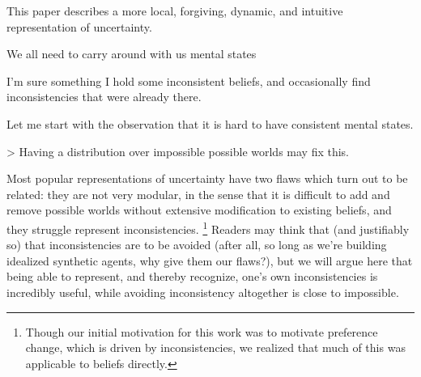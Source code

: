 \documentclass{article}
\newcommand\changeon{\color{note-fg} }
\begin{document}
	\changeon
	
	This paper describes a more local, forgiving, dynamic, and intuitive representation of uncertainty. 
	
	We all need to carry around with us mental states
	
	I'm sure something I hold some inconsistent beliefs, and occasionally find inconsistencies that were already there. 
	
	Let me start with the observation that it is hard to have consistent mental states.
	
		> Having a distribution over impossible possible worlds may fix this.

	Most popular representations of uncertainty have two flaws which turn out to be related: they are not very modular, in the sense that it is difficult to add and remove possible worlds without extensive modification to existing beliefs, and they struggle represent inconsistencies.%
	\footnote{Though our initial motivation for this work was to motivate preference change, which is driven by inconsistencies, we realized that much of this was applicable to beliefs directly. }
	Readers may think that (and justifiably so) that inconsistencies are to be avoided (after all, so long as we're building idealized synthetic agents, why give them our flaws?), but we will argue here that being able to represent, and thereby recognize, one's own inconsistencies is incredibly useful, while avoiding inconsistency altogether is close to impossible.
\end{document}
